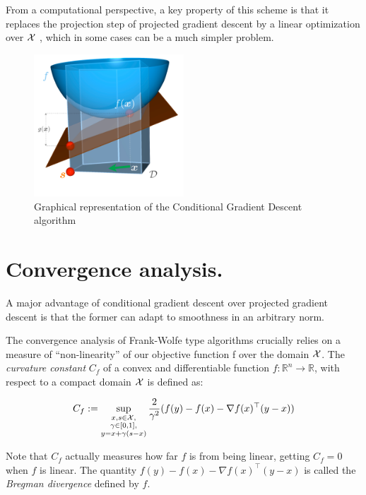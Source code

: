 From a computational perspective, a key property of this scheme is that it replaces the projection step of projected gradient descent by a linear optimization over $\mathcal{X}$ , which in some cases can be a
much simpler problem.

\begin{figure}[ht]
\begin{center}
   \includegraphics[width=0.5\textwidth]{img/frank_wolfe}
\end{center}
   \caption{Graphical representation of the Conditional Gradient Descent algorithm \cite{Jaggi2013}}
   \label{fig:frank_wolfe}
\end{figure}


\section{Convergence analysis.}

A major advantage of conditional gradient descent over projected gradient descent is that the former can adapt to smoothness in an arbitrary norm.

\if
The convergence analysis of Frank-Wolfe type algorithms crucially relies on a measure of “non-linearity” of our objective function f over the domain $\mathcal{X}$. The \emph{curvature constant} $C_f$ of a convex and differentiable function $f:\mathbb{R}^n \rightarrow \mathbb{R}$, with respect to a compact domain $\mathcal{X}$ is defined as:

\begin{equation} \label{eq:curv_const}
C_f := \sup_{ \substack{x,s \in \mathcal{X},\\ \gamma \in [0,1],\\ y=x+\gamma(s-x)} } \frac{2}{\gamma^2} (f(y)-f(x)-\nabla f(x)^\top (y-x))
\end{equation}

Note that $C_f$ actually measures how far $f$ is from being linear, getting $C_f=0$ when $f$ is linear. The quantity $f(y)-f(x)-\nabla f(x)^\top (y-x)$ is called the \emph{Bregman divergence} defined by $f$.
\fi

